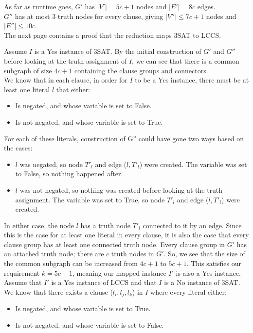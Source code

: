 \documentclass[11pt]{article}
\begin{document}
\begin{enumerate}
\begin{soln}
As far as runtime goes, $G'$ has $|V'| = 5c+1$ nodes and $|E'| = 8c$ edges. \\
$G''$ has at most 3 truth nodes for every clause, giving $|V''| \leq 7c+1$ nodes and $|E''| \leq 10c$. \\

The next page contains a proof that the reduction maps 3SAT to LCCS.

\newpage
Assume $I$ is a Yes instance of 3SAT. By the initial construction of $G'$ and $G''$ before looking at the truth assignment of $I$, we can see that there is a common subgraph of size $4c+1$ containing the clause groups and connectors. \\ 

We know that in each clause, in order for $I$ to be a Yes instance, there must be at least one literal $l$ that either:
\begin{itemize}
    \item Is negated, and whose variable is set to False.
    \item Is not negated, and whose variable is set to True.
\end{itemize}

For each of these literals, construction of G'' could have gone two ways based on the cases:
\begin{itemize}
    \item $l$ was negated, so node $T'_l$ and edge ($l, T'_l$) were created. The variable was set to False, so nothing happened after.
    \item $l$ was not negated, so nothing was created before looking at the truth assignment. The variable was set to True, so node $T'_l$ and edge ($l, T'_l$) were created.
\end{itemize}

In either case, the node $l$ has a truth node $T'_l$ connected to it by an edge. Since this is the case for at least one literal in every clause, it is also the case that every clause group has at least one connected truth node. Every clause group in $G'$ has an attached truth node; there are $c$ truth nodes in $G'$. So, we see that the size of the common subgraph can be increased from $4c+1$ to $5c+1$. This satisfies our requirement $k=5c+1$, meaning our mapped instance $I'$ is also a Yes instance. \\

Assume that $I'$ is a Yes instance of LCCS and that $I$ is a No instance of 3SAT. We know that there exists a clause ($l_i, l_j, l_k$) in $I$ where every literal either:
\begin{itemize}
    \item Is negated, and whose variable is set to True.
    \item Is not negated, and whose variable is set to False.
\end{itemize}


\end{soln}
\end{enumerate}
\end{document}

